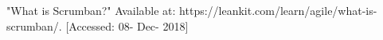  "What is Scrumban?" Available at: https://leankit.com/learn/agile/what-is-scrumban/. [Accessed: 08- Dec- 2018]
\\